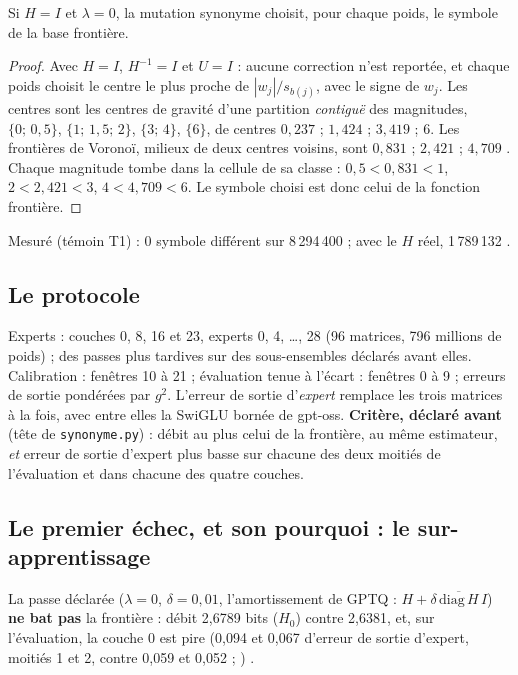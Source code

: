 \begin{proposition}[Le témoin qui sait tomber : $H = I$ rend la frontière]\label{t3ecl:prop:temoin}
Si $H = I$ et $\lambda = 0$, la mutation synonyme choisit, pour chaque poids, le symbole de la base frontière.
\end{proposition}

\begin{proof}
Avec $H = I$, $H^{-1} = I$ et $U = I$ : aucune correction n'est reportée, et chaque poids choisit le centre le plus proche de $|w_j|/s_{b(j)}$, avec le signe de $w_j$. Les centres sont les centres de gravité d'une partition \emph{contiguë} des magnitudes, $\{0;\,0{,}5\}$, $\{1;\,1{,}5;\,2\}$, $\{3;\,4\}$, $\{6\}$, de centres $0{,}237$ ; $1{,}424$ ; $3{,}419$ ; $6$. Les frontières de Voronoï, milieux de deux centres voisins, sont $0{,}831$ ; $2{,}421$ ; $4{,}709$ \calc. Chaque magnitude tombe dans la cellule de sa classe : $0{,}5 < 0{,}831 < 1$, $2 < 2{,}421 < 3$, $4 < 4{,}709 < 6$. Le symbole choisi est donc celui de la fonction frontière.
\end{proof}

Mesuré (témoin T1) : 0 symbole différent sur 8\,294\,400 ; avec le $H$ réel, 1\,789\,132 \mes.

\subsection{Le protocole}

Experts : couches 0, 8, 16 et 23, experts 0, 4, \ldots, 28 (96 matrices, 796 millions de poids) ; des passes plus tardives sur des sous-ensembles déclarés avant elles. Calibration : fenêtres 10 à 21 ; évaluation tenue à l'écart : fenêtres 0 à 9 ; erreurs de sortie pondérées par $g^2$. L'erreur de sortie d'\emph{expert} remplace les trois matrices à la fois, avec entre elles la SwiGLU bornée de gpt-oss. \textbf{Critère, déclaré avant} (tête de \texttt{synonyme.py}) : débit au plus celui de la frontière, au même estimateur, \emph{et} erreur de sortie d'expert plus basse sur chacune des deux moitiés de l'évaluation et dans chacune des quatre couches.

\subsection{Le premier échec, et son pourquoi : le sur-apprentissage}

La passe déclarée ($\lambda = 0$, $\delta = 0{,}01$, l'amortissement de GPTQ : $H + \delta\,\overline{\mathrm{diag}\,H}\, I$) \textbf{ne bat pas} la frontière : débit 2,6789 bits ($H_0$) contre 2,6381, et, sur l'évaluation, la couche 0 est pire (0,094 et 0,067 d'erreur de sortie d'expert, moitiés 1 et 2, contre 0,059 et 0,052 ; ) \mes.

